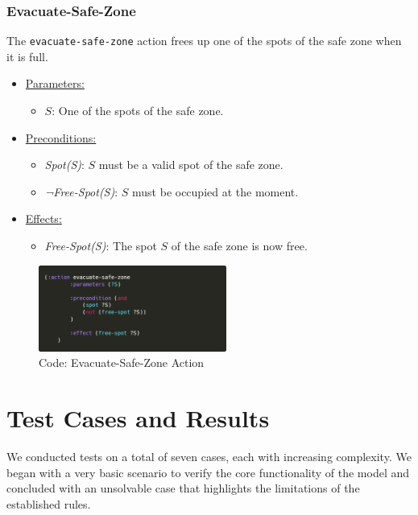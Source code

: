 \documentclass{article}
\begin{document}
\subsubsection{Evacuate-Safe-Zone}
The \texttt{evacuate-safe-zone} action frees up one of the spots of the safe zone when it is full.
\begin{itemize}
    \item \underline{Parameters:}
    \begin{itemize}
        \item $S$: One of the spots of the safe zone.
    \end{itemize}
    \item \underline{Preconditions:}
    \begin{itemize}
        \item \textit{Spot(S)}: $S$ must be a valid spot of the safe zone.
        \item \textit{¬Free-Spot(S)}: $S$ must be occupied at the moment.
    \end{itemize}
    \item \underline{Effects:}
    \begin{itemize}
        \item \textit{Free-Spot(S)}: The spot $S$ of the safe zone is now free.
    \end{itemize}
\end{itemize}
\begin{figure}[ht]
    \centering
    \includegraphics[width=0.55\textwidth]{assets/solution_coordinates/evacuate-safe-zone.png}
    \caption{Code: Evacuate-Safe-Zone Action}
    \label{fig:act:evacuate}
\end{figure}

\section{Test Cases and Results}

We conducted tests on a total of seven cases, each with increasing complexity. We began with a very basic scenario to verify the core functionality of the model and concluded with an unsolvable case that highlights the limitations of the established rules.
\end{document}
